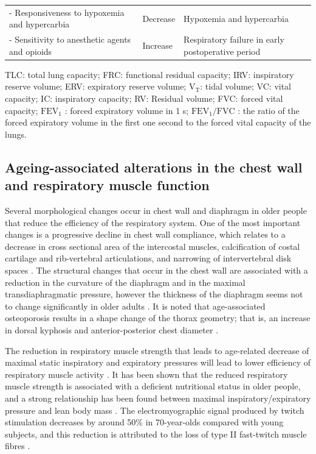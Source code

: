 \begin{table}[htbp]
\begin{tabular}{p{5.8cm} p{3.6cm} p{4.8cm}}
- Responsiveness to hypoxemia and hypercarbia & Decrease & Hypoxemia and hypercarbia\\
- Sensitivity to anesthetic agents and opioids & Increase & Respiratory failure in early postoperative period\\
\hline
\end{tabular}
\begin{tablenotes}
        \footnotesize
        \item{TLC: total lung capacity; FRC: functional residual capacity; IRV: inspiratory reserve volume; ERV: expiratory reserve volume; $\mathrm{V_T}$: tidal volume; VC: vital capacity; IC: inspiratory capacity; RV: Residual volume; FVC: forced vital capacity; $\mathrm{FEV_1}$ : forced expiratory volume in 1 s; $\mathrm{FEV_1/FVC}$ : the ratio of the forced expiratory volume in the first one second to the forced vital capacity of the lungs.}
\end{tablenotes}
\end{table}

\subsection{Ageing-associated alterations in the chest wall and respiratory muscle function} \label{ChestWallChange}
Several morphological changes occur in chest wall and diaphragm in older people that reduce the efficiency of the respiratory system. One of the most important changes is a progressive decline in chest wall compliance, which relates to a decrease in cross sectional area of the intercostal muscles, calcification of costal cartilage and rib-vertebral articulations, and narrowing of intervertebral disk spaces \citep{murray1986normal, crapo1993aging}. The structural changes that occur in the chest wall are associated with a reduction in the curvature of the diaphragm and in the maximal transdiaphragmatic pressure, however the thickness of the diaphragm seems not to change significantly in older adults \citep{zaugg2000respiratory, sprung2006age}. It is noted that age-associated osteoporosis results in a shape change of the thorax geometry; that is, an increase in dorsal kyphosis and anterior-posterior chest diameter \citep{janssens1999physiological,sprung2006age}. 

The reduction in respiratory muscle strength that leads to age-related decrease of maximal static inspiratory and expiratory pressures will lead to lower efficiency of respiratory muscle activity \citep{wijesinghe2005effect,sprung2006age,lalley2013aging}. It has been shown that the reduced respiratory muscle strength is associated with a deficient nutritional status in older people, and a strong relationship has been found between maximal inspiratory/expiratory pressure and lean body mass \citep{arora1982respiratory,janssens1999physiological}. The electromyographic signal produced by twitch stimulation decreases by around 50\% in 70-year-olds compared with young subjects, and this reduction is attributed to the loss of type II fast-twitch muscle fibres \citep{larsson1983histochemical}. 


